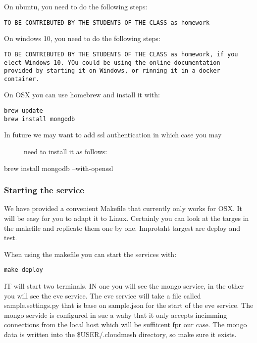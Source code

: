 On ubuntu, you need to do the following steps:

\begin{verbatim}
TO BE CONTRIBUTED BY THE STUDENTS OF THE CLASS as homework
\end{verbatim}

On windows 10, you need to do the following steps:

\begin{verbatim}
TO BE CONTRIBUTED BY THE STUDENTS OF THE CLASS as homework, if you
elect Windows 10. YOu could be using the online documentation
provided by starting it on Windows, or rinning it in a docker container.
\end{verbatim}

On OSX you can use homebrew and install it with:

\begin{verbatim}
brew update
brew install mongodb
\end{verbatim}

\begin{description}
\item[In future we may want to add ssl authentication in which case you
may]
need to install it as follows:
\end{description}

brew install mongodb --with-openssl

\subsubsection{Starting the service}\label{starting-the-service}

We have provided a convenient Makefile that currently only works for
OSX. It will be easy for you to adapt it to Linux. Certainly you can
look at the targes in the makefile and replicate them one by one.
Improtaht targest are deploy and test.

When using the makefile you can start the services with:

\begin{verbatim}
make deploy
\end{verbatim}

IT will start two terminals. IN one you will see the mongo service, in
the other you will see the eve service. The eve service will take a file
called sample.settings.py that is base on sample.json for the start of
the eve service. The mongo servide is configured in suc a wahy that it
only accepts incimming connections from the local host which will be
suffiicent fpr our case. The mongo data is written into the
\$USER/.cloudmesh directory, so make sure it exists.

